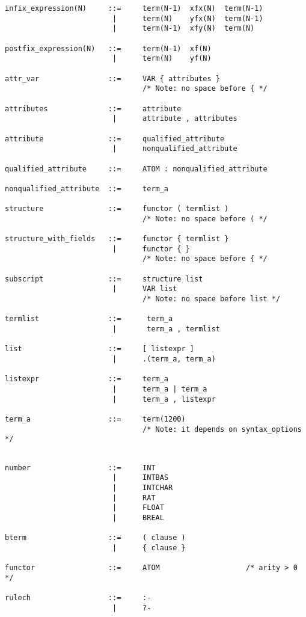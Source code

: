 \vfill\pagebreak %
\begin{verbatim}
infix_expression(N)     ::=     term(N-1)  xfx(N)  term(N-1)
                         |      term(N)    yfx(N)  term(N-1)
                         |      term(N-1)  xfy(N)  term(N)

postfix_expression(N)   ::=     term(N-1)  xf(N)
                         |      term(N)    yf(N)

attr_var                ::=     VAR { attributes }
                                /* Note: no space before { */

attributes              ::=     attribute
                         |      attribute , attributes

attribute               ::=     qualified_attribute
                         |      nonqualified_attribute

qualified_attribute     ::=     ATOM : nonqualified_attribute

nonqualified_attribute  ::=     term_a

structure               ::=     functor ( termlist )
                                /* Note: no space before ( */

structure_with_fields   ::=     functor { termlist }
                         |      functor { }
                                /* Note: no space before { */

subscript               ::=     structure list
                         |      VAR list
                                /* Note: no space before list */

termlist                ::=      term_a
                         |       term_a , termlist

list                    ::=     [ listexpr ]
                         |      .(term_a, term_a)

listexpr                ::=     term_a
                         |      term_a | term_a
                         |      term_a , listexpr

term_a                  ::=     term(1200)
                                /* Note: it depends on syntax_options */

\end{verbatim}
\vfill\pagebreak %
\begin{verbatim}

number                  ::=     INT
                         |      INTBAS
                         |      INTCHAR
                         |      RAT
                         |      FLOAT
                         |      BREAL

bterm                   ::=     ( clause )
                         |      { clause }

functor                 ::=     ATOM                    /* arity > 0 */

rulech                  ::=     :-
                         |      ?-
\end{verbatim}



